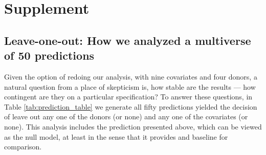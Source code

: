 \documentclass[11pt,3p,review,authoryear]{elsarticle}
\theoremstyle{definition}
\begin{document}
\section{Supplement}

\subsection{Leave-one-out: How we analyzed a multiverse of 50 predictions}

Given the option of redoing our analysis, with nine covariates and four donors, a natural question from a place of skepticism is, how stable are the results --- how contingent are they on a particular specification?  To answer these questions, in Table \ref{tab:prediction_table} we generate all fifty predictions yielded the decision of leave out any one of the donors (or none) and any one of the covariates (or none).  This analysis includes the prediction presented above, which can be viewed as the null model, at least in the sense that it provides and baseline for comparison.
\end{document}
